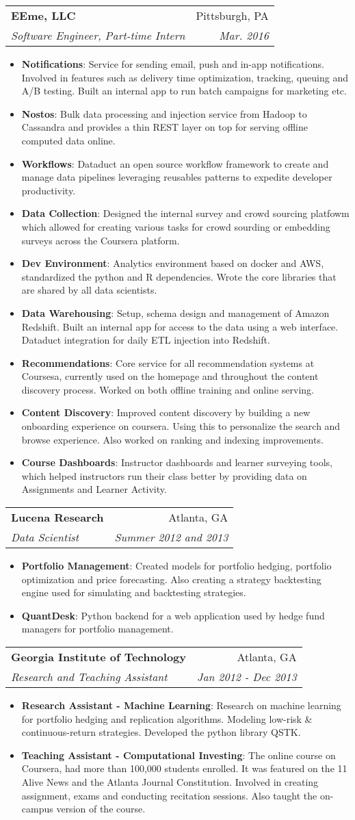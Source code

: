 \documentclass[letterpaper,11pt]{article}
\makeatletter
\newcommand{\resumeItem}[2]{
	\item\small{
		\textbf{#1}{: #2 \vspace{-2pt}}
	}
}
\newcommand{\resumeSubheading}[4]{
	\vspace{-1pt}\item
	\begin{tabular*}{0.97\textwidth}{l@{\extracolsep{\fill}}r}
		\textbf{#1} & #2 \\
		\textit{\small#3} & \textit{\small #4} \\
	\end{tabular*}\vspace{-5pt}
}
\newcommand{\resumeItemListStart}{\begin{itemize}}
\newcommand{\resumeItemListEnd}{\end{itemize}\vspace{-5pt}}
\makeatother
\begin{document}
	\resumeSubheading
	{EEme, LLC}{Pittsburgh, PA}
	{Software Engineer, Part-time Intern}{Mar. 2016}
	\resumeItemListStart
	\resumeItem{Notifications}
	{Service for sending email, push and in-app notifications. Involved in features such as delivery time optimization, tracking, queuing and A/B testing. Built an internal app to run batch campaigns for marketing etc.}
	\resumeItem{Nostos}
	{Bulk data processing and injection service from Hadoop to Cassandra and provides a thin REST layer on top for serving offline computed data online.}
	\resumeItem{Workflows}
	{Dataduct an open source workflow framework to create and manage data pipelines leveraging reusables patterns to expedite developer productivity.}
	\resumeItem{Data Collection}
	{Designed the internal survey and crowd sourcing platfowm which allowed for creating various tasks for crowd sourding or embedding surveys across the Coursera platform.}
	\resumeItem{Dev Environment}
	{Analytics environment based on docker and AWS, standardized the python and R dependencies. Wrote the core libraries that are shared by all data scientists.}
	\resumeItem{Data Warehousing}
	{Setup, schema design and management of Amazon Redshift. Built an internal app for access to the data using a web interface. Dataduct integration for daily ETL injection into Redshift.}
	\resumeItem{Recommendations}
	{Core service for all recommendation systems at Coursesa, currently used on the homepage and throughout the content discovery process. Worked on both offline training and online serving.}
	\resumeItem{Content Discovery}
	{Improved content discovery by building a new onboarding experience on coursera. Using this to personalize the search and browse experience. Also worked on ranking and indexing improvements.}
	\resumeItem{Course Dashboards}
	{Instructor dashboards and learner surveying tools, which helped instructors run their class better by providing data on Assignments and Learner Activity.}
	\resumeItemListEnd
	
	\resumeSubheading
	{Lucena Research}{Atlanta, GA}
	{Data Scientist}{Summer 2012 and 2013}
	\resumeItemListStart
	\resumeItem{Portfolio Management}
	{Created models for portfolio hedging,  portfolio optimization and price forecasting. Also creating a strategy backtesting engine used for simulating and backtesting strategies.}
	\resumeItem{QuantDesk}
	{Python backend for a web application used by hedge fund managers for portfolio management.}
	\resumeItemListEnd
	
	\resumeSubheading
	{Georgia Institute of Technology}{Atlanta, GA}
	{Research and Teaching Assistant}{Jan 2012 - Dec 2013}
	\resumeItemListStart
	\resumeItem{Research Assistant - Machine Learning}
	{Research on machine learning for portfolio hedging and replication algorithms. Modeling low-risk \& continuous-return strategies. Developed the python library QSTK.}
	\resumeItem{Teaching Assistant - Computational Investing}
	{The online course on Coursera, had more than 100,000 students enrolled. It was featured on the 11 Alive News and the Atlanta Journal Constitution. Involved in creating assignment, exams and conducting recitation sessions. Also taught the on-campus version of the course.}
	\resumeItemListEnd
	
\end{document}
